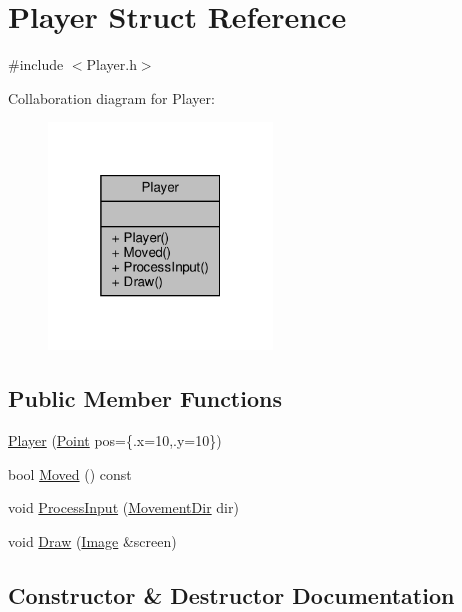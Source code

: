 \hypertarget{structPlayer}{}\section{Player Struct Reference}
\label{structPlayer}


{\ttfamily \#include $<$Player.\+h$>$}



Collaboration diagram for Player\+:\nopagebreak
\begin{figure}[H]
\begin{center}
\leavevmode
\includegraphics[width=169pt]{structPlayer__coll__graph}
\end{center}
\end{figure}
\subsection*{Public Member Functions}
\begin{DoxyCompactItemize}
\item 
\hyperlink{structPlayer_a02434d25ce99e4bedb9f30c6cd76c73c}{Player} (\hyperlink{structPoint}{Point} pos=\{.x=10,.y=10\})
\item 
bool \hyperlink{structPlayer_a743da3dcbc81ed11bfcb81943aae175b}{Moved} () const
\item 
void \hyperlink{structPlayer_a4b275c51f881fb61b52d1ede3d1dcba3}{Process\+Input} (\hyperlink{Player_8h_aa91f5cffa9b1b82e96c8824b1fe5c61f}{Movement\+Dir} dir)
\item 
void \hyperlink{structPlayer_a1a10995b61d63b46c6b562bd026382c4}{Draw} (\hyperlink{structImage}{Image} \&screen)
\end{DoxyCompactItemize}


\subsection{Constructor \& Destructor Documentation}
\mbox{\label{structPlayer_a02434d25ce99e4bedb9f30c6cd76c73c}} 
